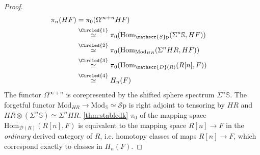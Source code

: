 \documentclass[10pt]{amsart}
\newcommand{\D}{\mathscr{D}}
\newcommand{\bS}{\mathbb{S}}
\newcommand{\Hom}{\mathrm{Hom}}
\newcommand{\Sp}{\mathscr{S}\mathrm{p}}
\newcommand{\Mod}{\mathrm{Mod}}
\theoremstyle{definition}
\theoremstyle{remark}
\numberwithin{equation}{section}
\begin{document}
\begin{proof}
  \begin{align*}
    \pi_n(HF) & =\pi_0(\Omega^{\infty+n}HF)\\
    & \overset{\Circled{1}}{\simeq} \pi_0(\Hom_{\Sp}(\Sigma^n\bS,HF)) \\
    & \overset{\Circled{2}}{\simeq} \pi_0(\Hom_{\Mod_{HR}}(\Sigma^n HR,HF)) & \\
    & \overset{\Circled{3}}{\simeq} \pi_0(\Hom_{\D(R)}(R[n],F))\\
    & \overset{\Circled{4}}{\simeq} H_n(F)
  \end{align*}  The functor $\Omega^{\infty+n}$ is corepresented by the shifted sphere spectrum $\Sigma^n\bS$.  The forgetful functor $\Mod_{HR}\to\Mod_\bS\simeq\Sp$ is right adjoint to tensoring by $HR$ and $HR\otimes(\Sigma^n\bS)\simeq \Sigma^nHR$.  \cref{thm:stabledk}  $\pi_0$ of the mapping space $\Hom_{\D(R)}(R[n],F)$ is equivalent to the mapping space $R[n]\to F$ in the \emph{ordinary} derived category of $R$, i.e. homotopy classes of maps $R[n]\to F$, which correspond exactly to classes in $H_n(F)$.
\end{proof}
\end{document}
